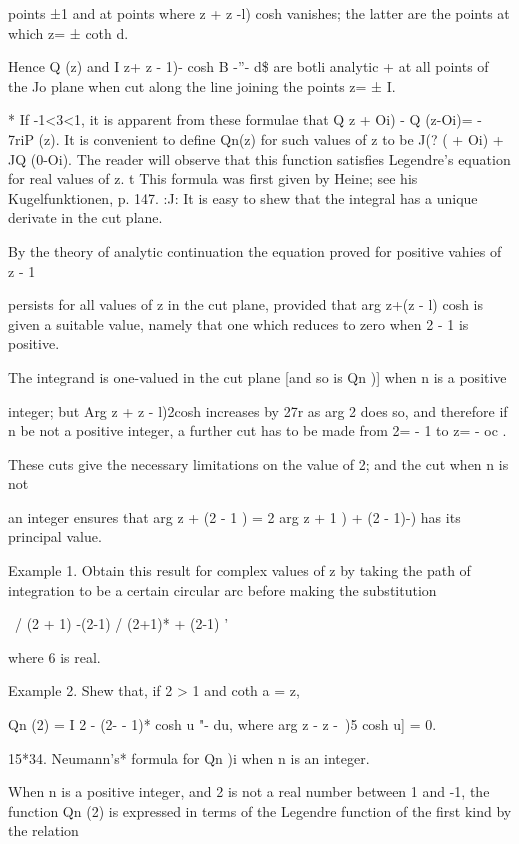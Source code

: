 {{points ±1 and at points where z + z -l) cosh vanishes; the latter are
the points at which z= ± coth d.

Hence Q (z) and I z+ z - 1)- cosh B -''- d\$ are botli analytic + at
all points of the Jo plane when cut along the line joining the points
z= ± I.

* If -1<3<1, it is apparent from these formulae that Q z + Oi) - Q
(z-Oi)= - 7riP (z). It is convenient to define Qn(z) for such values
of z to be J(? ( + Oi) + JQ (0-Oi). The reader will observe that this
function satisfies Legendre's equation for real values of z. t This
formula was first given by Heine; see his Kugelfunktionen, p. 147.
:J: It is easy to shew that the integral has a unique derivate in the
cut plane.

%
%

By the theory of analytic continuation the equation proved for
positive vahies of z - 1

persists for all values of z in the cut plane, provided that arg z+(z
- l) cosh is given a suitable value, namely that one which reduces to
zero when 2 - 1 is positive.

The integrand is one-valued in the cut plane [and so is Qn )] when n
is a positive

integer; but Arg z + z - l)2cosh increases by 27r as arg 2 does so,
and therefore if n be not a positive integer, a further cut has to be
made from 2= - 1 to z= - oc .

These cuts give the necessary limitations on the value of 2; and the
cut when n is not

an integer ensures that arg z + (2 - 1 ) = 2 arg z + 1 ) + (2 - 1)-)
has its principal value.

Example 1. Obtain this result for complex values of z by taking the
path of integration to be a certain circular arc before making the
substitution

 \ / (2 + 1) -(2-1) / (2+1)* + (2-1) '

where 6 is real.

Example 2. Shew that, if 2 > 1 and coth a = z,

Qn (2) = I 2 - (2- - 1)* cosh u "- du, where arg z - z -\ )5 cosh u] =
0. 

15*34. Neumann's* formula for Qn )i when n is an integer.

When n is a positive integer, and 2 is not a real number between 1 and
-1, the function Qn (2) is expressed in terms of the Legendre function
of the first kind by the relation

}}
